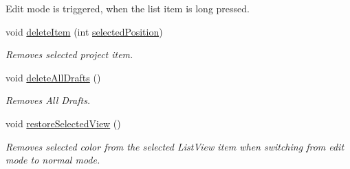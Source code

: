 \begin{DoxyCompactItemize}
\begin{DoxyCompactList}
Edit mode is triggered, when the list item is long pressed. \end{DoxyCompactList}\item 
void \hyperlink{classorg_1_1buildmlearn_1_1toolkit_1_1fragment_1_1DraftsFragment_a631069e1a6c2ba1010c077facdd1847f}{delete\+Item} (int \hyperlink{classorg_1_1buildmlearn_1_1toolkit_1_1fragment_1_1DraftsFragment_a133f99d6233f9f26ab03ebb14fe5f4b3}{selected\+Position})
\begin{DoxyCompactList}\small\item\em Removes selected project item. \end{DoxyCompactList}\item 
void \hyperlink{classorg_1_1buildmlearn_1_1toolkit_1_1fragment_1_1DraftsFragment_a53efe88465e3ec05b9dc446ca4817932}{delete\+All\+Drafts} ()
\begin{DoxyCompactList}\small\item\em Removes All Drafts. \end{DoxyCompactList}\item 
void \hyperlink{classorg_1_1buildmlearn_1_1toolkit_1_1fragment_1_1DraftsFragment_a6de95208d316f33fff13615cea2e450e}{restore\+Selected\+View} ()
\begin{DoxyCompactList}\small\item\em Removes selected color from the selected List\+View item when switching from edit mode to normal mode. \end{DoxyCompactList}\end{DoxyCompactItemize}
